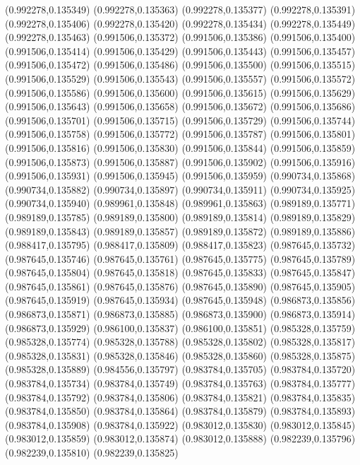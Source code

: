 (0.992278,0.135349)
(0.992278,0.135363)
(0.992278,0.135377)
(0.992278,0.135391)
(0.992278,0.135406)
(0.992278,0.135420)
(0.992278,0.135434)
(0.992278,0.135449)
(0.992278,0.135463)
(0.991506,0.135372)
(0.991506,0.135386)
(0.991506,0.135400)
(0.991506,0.135414)
(0.991506,0.135429)
(0.991506,0.135443)
(0.991506,0.135457)
(0.991506,0.135472)
(0.991506,0.135486)
(0.991506,0.135500)
(0.991506,0.135515)
(0.991506,0.135529)
(0.991506,0.135543)
(0.991506,0.135557)
(0.991506,0.135572)
(0.991506,0.135586)
(0.991506,0.135600)
(0.991506,0.135615)
(0.991506,0.135629)
(0.991506,0.135643)
(0.991506,0.135658)
(0.991506,0.135672)
(0.991506,0.135686)
(0.991506,0.135701)
(0.991506,0.135715)
(0.991506,0.135729)
(0.991506,0.135744)
(0.991506,0.135758)
(0.991506,0.135772)
(0.991506,0.135787)
(0.991506,0.135801)
(0.991506,0.135816)
(0.991506,0.135830)
(0.991506,0.135844)
(0.991506,0.135859)
(0.991506,0.135873)
(0.991506,0.135887)
(0.991506,0.135902)
(0.991506,0.135916)
(0.991506,0.135931)
(0.991506,0.135945)
(0.991506,0.135959)
(0.990734,0.135868)
(0.990734,0.135882)
(0.990734,0.135897)
(0.990734,0.135911)
(0.990734,0.135925)
(0.990734,0.135940)
(0.989961,0.135848)
(0.989961,0.135863)
(0.989189,0.135771)
(0.989189,0.135785)
(0.989189,0.135800)
(0.989189,0.135814)
(0.989189,0.135829)
(0.989189,0.135843)
(0.989189,0.135857)
(0.989189,0.135872)
(0.989189,0.135886)
(0.988417,0.135795)
(0.988417,0.135809)
(0.988417,0.135823)
(0.987645,0.135732)
(0.987645,0.135746)
(0.987645,0.135761)
(0.987645,0.135775)
(0.987645,0.135789)
(0.987645,0.135804)
(0.987645,0.135818)
(0.987645,0.135833)
(0.987645,0.135847)
(0.987645,0.135861)
(0.987645,0.135876)
(0.987645,0.135890)
(0.987645,0.135905)
(0.987645,0.135919)
(0.987645,0.135934)
(0.987645,0.135948)
(0.986873,0.135856)
(0.986873,0.135871)
(0.986873,0.135885)
(0.986873,0.135900)
(0.986873,0.135914)
(0.986873,0.135929)
(0.986100,0.135837)
(0.986100,0.135851)
(0.985328,0.135759)
(0.985328,0.135774)
(0.985328,0.135788)
(0.985328,0.135802)
(0.985328,0.135817)
(0.985328,0.135831)
(0.985328,0.135846)
(0.985328,0.135860)
(0.985328,0.135875)
(0.985328,0.135889)
(0.984556,0.135797)
(0.983784,0.135705)
(0.983784,0.135720)
(0.983784,0.135734)
(0.983784,0.135749)
(0.983784,0.135763)
(0.983784,0.135777)
(0.983784,0.135792)
(0.983784,0.135806)
(0.983784,0.135821)
(0.983784,0.135835)
(0.983784,0.135850)
(0.983784,0.135864)
(0.983784,0.135879)
(0.983784,0.135893)
(0.983784,0.135908)
(0.983784,0.135922)
(0.983012,0.135830)
(0.983012,0.135845)
(0.983012,0.135859)
(0.983012,0.135874)
(0.983012,0.135888)
(0.982239,0.135796)
(0.982239,0.135810)
(0.982239,0.135825)
